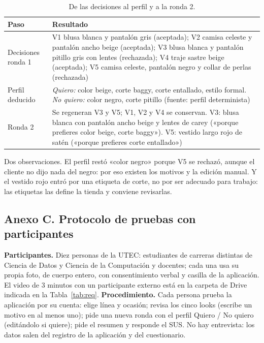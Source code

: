 \documentclass[11pt,letterpaper]{article}
\begin{document}
\begin{table}[H]
\centering
\caption{De las decisiones al perfil y a la ronda 2.}
\small
\begin{tabularx}{\textwidth}{@{}p{3.1cm}L@{}}
\toprule
\textbf{Paso} & \textbf{Resultado} \\
\midrule
Decisiones ronda 1 & V1 blusa blanca y pantalón gris (aceptada); V2 camisa celeste y pantalón ancho beige (aceptada); V3 blusa blanca y pantalón pitillo gris con lentes (rechazada); V4 traje sastre beige (aceptada); V5 camisa celeste, pantalón negro y collar de perlas (rechazada) \\
Perfil deducido & \emph{Quiero:} color beige, corte baggy, corte entallado, estilo formal. \emph{No quiero:} color negro, corte pitillo (fuente: perfil determinista) \\
Ronda 2 & Se regeneran V3 y V5; V1, V2 y V4 se conservan. V3: blusa blanca con pantalón ancho beige y lentes de carey («porque prefieres color beige, corte baggy»). V5: vestido largo rojo de satén («porque prefieres corte entallado») \\
\bottomrule
\end{tabularx}
\end{table}

Dos observaciones. El perfil restó «color negro» porque V5 se rechazó, aunque el cliente no dijo nada del negro: por eso
existen los motivos y la edición manual. Y el vestido rojo entró por una etiqueta de corte, no por ser adecuado para
trabajo: las etiquetas las define la tienda y conviene revisarlas.

\subsection*{Anexo C. Protocolo de pruebas con participantes}
\label{anx:part}
\textbf{Participantes.} Diez personas de la UTEC: estudiantes de carreras distintas de Ciencia de Datos y Ciencia de la
Computación y docentes; cada una usa su propia foto, de cuerpo entero, con consentimiento verbal y casilla de la
aplicación. El video de 3 minutos con un participante externo está en la carpeta de Drive indicada en la
Tabla~\ref{tab:req}.
\textbf{Procedimiento.} Cada persona prueba la aplicación por su cuenta: elige línea y ocasión; revisa los cinco looks
(escribe un motivo en al menos uno); pide una nueva ronda con el perfil Quiero / No quiero (editándolo si quiere); pide el
resumen y responde el SUS. No hay entrevista: los datos salen del registro de la aplicación y del cuestionario.
\end{document}
